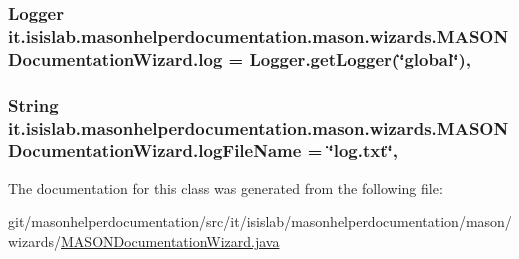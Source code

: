 \hypertarget{classit_1_1isislab_1_1masonhelperdocumentation_1_1mason_1_1wizards_1_1_m_a_s_o_n_documentation_wizard_ad7cf684a5c448aa057721a59401e2a5d}{
\subsubsection[{log}]{\setlength{\rightskip}{0pt plus 5cm}Logger it.\-isislab.\-masonhelperdocumentation.\-mason.\-wizards.\-M\-A\-S\-O\-N\-Documentation\-Wizard.\-log = Logger.\-get\-Logger(\char`\"{}global\char`\"{})\hspace{0.3cm}{\ttfamily [static]}, {\ttfamily [private]}}}\label{classit_1_1isislab_1_1masonhelperdocumentation_1_1mason_1_1wizards_1_1_m_a_s_o_n_documentation_wizard_ad7cf684a5c448aa057721a59401e2a5d}
\hypertarget{classit_1_1isislab_1_1masonhelperdocumentation_1_1mason_1_1wizards_1_1_m_a_s_o_n_documentation_wizard_a8cff8f361185fdae7ef6d181e2bef353}{
\subsubsection[{log\-File\-Name}]{\setlength{\rightskip}{0pt plus 5cm}String it.\-isislab.\-masonhelperdocumentation.\-mason.\-wizards.\-M\-A\-S\-O\-N\-Documentation\-Wizard.\-log\-File\-Name = \char`\"{}log.\-txt\char`\"{}\hspace{0.3cm}{\ttfamily [static]}, {\ttfamily [private]}}}\label{classit_1_1isislab_1_1masonhelperdocumentation_1_1mason_1_1wizards_1_1_m_a_s_o_n_documentation_wizard_a8cff8f361185fdae7ef6d181e2bef353}


The documentation for this class was generated from the following file\-:\begin{DoxyCompactItemize}
\item 
git/masonhelperdocumentation/src/it/isislab/masonhelperdocumentation/mason/wizards/\hyperlink{_m_a_s_o_n_documentation_wizard_8java}{M\-A\-S\-O\-N\-Documentation\-Wizard.\-java}\end{DoxyCompactItemize}
